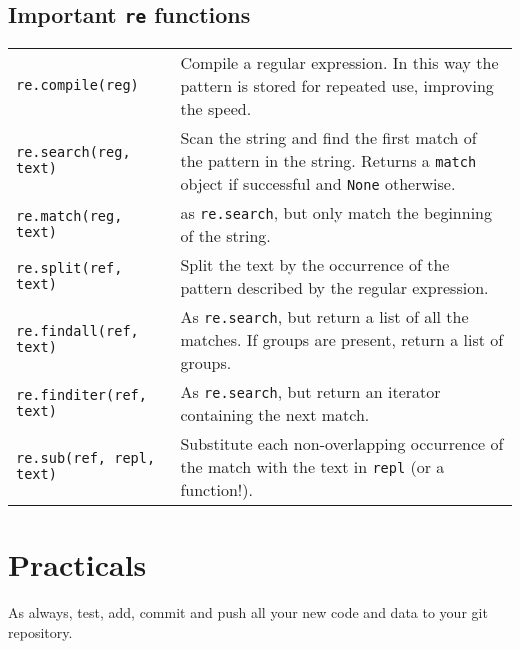   



\subsection{Important {\tt re} functions}

\begin{tabular}{p{5.4cm} p{9cm}} 
   
  {\tt re.compile(reg)} & Compile a regular expression. In this way
    the pattern is stored for repeated use, improving the speed.\\

	{\tt re.search(reg, text)} & Scan the string and find the first match 
	of the pattern in the string. Returns a {\tt match} object if 
	successful and {\tt None} otherwise.\\

	{\tt re.match(reg, text)} & as {\tt re.search}, but only match the 
	beginning of the string.\\

	{\tt re.split(ref, text)} & Split the text by the occurrence of the 
	pattern described by the regular expression.\\

	{\tt re.findall(ref, text)} & As {\tt re.search}, but return a list 
	of all the matches. If groups are present, return a list of groups.\\

	{\tt re.finditer(ref, text)} & As {\tt re.search}, but return an 
	iterator containing the next match.\\

	{\tt re.sub(ref, repl, text)} & Substitute each non-overlapping 
	occurrence of the match with the text in {\tt repl} (or a 
	function!).\\

\end{tabular}

\section{Practicals}
As always, test, add, commit and push all your new code and data to 
your git repository. 

